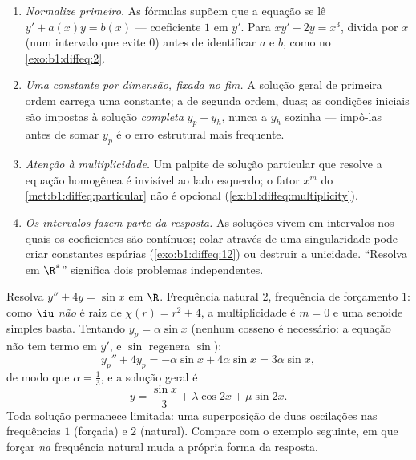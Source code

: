 \begin{remark}\label{rem:b1:diffeq:pitfalls}
\begin{enumerate}
  \item \emph{Normalize primeiro.} As fórmulas supõem que a equação
        se lê $y' + a(x)y = b(x)$ --- coeficiente $1$ em $y'$.
        Para $xy' - 2y = x^3$, divida por $x$ (num intervalo
        que evite $0$) antes de identificar $a$ e $b$, como no
        \cref{exo:b1:diffeq:2}.
  \item \emph{Uma constante por dimensão, fixada no fim.} A
        solução geral de primeira ordem carrega uma constante; a de
        segunda ordem, duas; as condições iniciais são impostas à
        solução \emph{completa} $y_p + y_h$, nunca a $y_h$
        sozinha --- impô-las antes de somar $y_p$ é o erro
        estrutural mais frequente.
  \item \emph{Atenção à multiplicidade.} Um palpite de solução
        particular que resolve a equação homogênea é invisível ao
        lado esquerdo; o fator $x^m$ do
        \cref{met:b1:diffeq:particular} não é opcional
        (\cref{ex:b1:diffeq:multiplicity}).
  \item \emph{Os intervalos fazem parte da resposta.} As soluções
        vivem em intervalos nos quais os coeficientes são contínuos;
        colar através de uma singularidade pode criar constantes
        espúrias (\cref{exo:b1:diffeq:12}) ou destruir a unicidade. ``Resolva
        em $\R^*$'' significa dois problemas independentes.
\end{enumerate}
\end{remark}

\begin{example}\label{ex:b1:diffeq:offresonance}
Resolva $y'' + 4y = \sin x$ em $\R$. Frequência natural $2$, frequência
de forçamento $1$: como $\iu$ \emph{não} é raiz de $\chi(r) = r^2
+ 4$, a multiplicidade é $m = 0$ e uma senoide simples basta.
Tentando $y_p = \alpha\sin x$ (nenhum cosseno é necessário: a equação não
tem termo em $y'$, e $\sin$ regenera $\sin$):
\[
y_p'' + 4y_p = -\alpha\sin x + 4\alpha\sin x = 3\alpha\sin x ,
\]
de modo que $\alpha = \frac13$, e a solução geral é
\[
y = \frac{\sin x}3 + \lambda\cos 2x + \mu\sin 2x .
\]
Toda solução permanece limitada: uma superposição de duas oscilações
nas frequências $1$ (forçada) e $2$ (natural). Compare com
o exemplo seguinte, em que forçar \emph{na} frequência natural
muda a própria forma da resposta.
\end{example}


